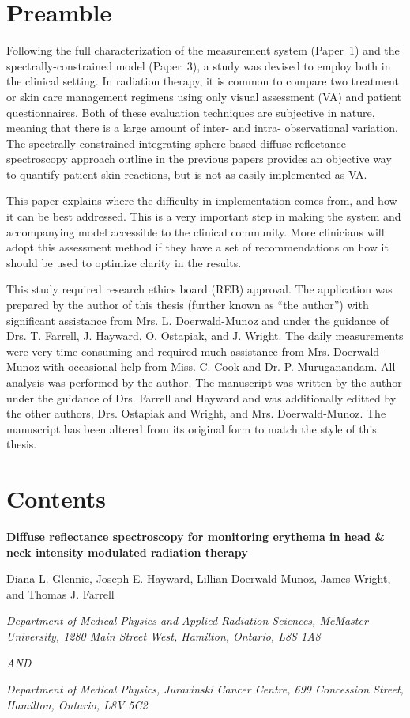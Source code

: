 \section*{Preamble}
Following the full characterization of the measurement system (Paper~1) and the spectrally-constrained model (Paper~3), a study was devised to employ both in the clinical setting. In radiation therapy, it is common to compare two treatment or skin care management regimens using only visual assessment (VA) and patient questionnaires. Both of these evaluation techniques are subjective in nature, meaning that there is a large amount of inter- and intra- observational variation. The spectrally-constrained integrating sphere-based diffuse reflectance spectroscopy approach outline in the previous papers provides an objective way to quantify patient skin reactions, but is not as easily implemented as VA.

This paper explains where the difficulty in implementation comes from, and how it can be best addressed. This is a very important step in making the system and accompanying model accessible to the clinical community. More clinicians will adopt this assessment method if they have a set of recommendations on how it should be used to optimize clarity in the results.

This study required research ethics board (REB) approval. The application was prepared by the author of this thesis (further known as ``the author'') with significant assistance from Mrs. L. Doerwald-Munoz and under the guidance of Drs. T. Farrell, J. Hayward, O. Ostapiak, and J. Wright. The daily measurements were very time-consuming and required much assistance from Mrs. Doerwald-Munoz with occasional help from Miss. C. Cook and Dr. P. Muruganandam. All analysis was performed by the author. The manuscript was written by the author under the guidance of Drs. Farrell and Hayward and was additionally editted by the other authors, Drs. Ostapiak and Wright, and Mrs. Doerwald-Munoz. The manuscript has been altered from its original form to match the style of this thesis.

\section*{Contents}

\begin{center}
	
	\textbf{Diffuse reflectance spectroscopy for monitoring erythema in head \& neck intensity modulated radiation therapy}
	
	Diana L. Glennie, Joseph E. Hayward, Lillian Doerwald-Munoz, James Wright, and Thomas J. Farrell
	
	\textit{Department of Medical Physics and Applied Radiation Sciences, McMaster University, 1280 Main Street West, Hamilton, Ontario, L8S 1A8}
	
	\textit{AND}
	
	\textit{Department of Medical Physics, Juravinski Cancer Centre, 699 Concession Street, Hamilton, Ontario, L8V 5C2}
	
\end{center}

